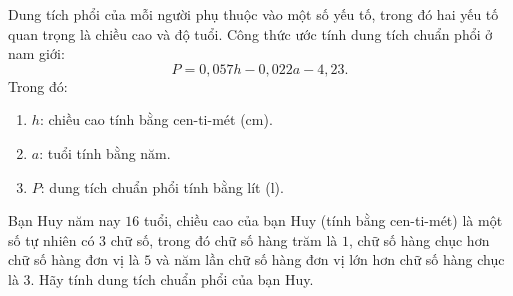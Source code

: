 \begin{bt}%
	Dung tích phổi của mỗi người phụ thuộc vào một số yếu tố, trong đó hai yếu tố quan trọng là chiều cao và độ tuổi. Công thức ước tính dung tích chuẩn phổi ở nam giới: $$P = 0,057h-0,022a-4,23.$$
	Trong đó: \begin{enumerate}
		\item [] $h$: chiều cao tính bằng cen-ti-mét (cm).
		\item [] $a$: tuổi tính bằng năm.
			\item [] $P$: dung tích chuẩn phổi tính bằng lít (l).
	\end{enumerate}
Bạn Huy năm nay $16$ tuổi, chiều cao của bạn Huy (tính bằng cen-ti-mét) là một số tự nhiên có $3$ chữ số, trong đó chữ số hàng trăm là $1$, chữ số hàng chục hơn chữ số hàng đơn vị là $5$ và năm lần chữ số hàng đơn vị lớn hơn chữ số hàng chục là $3$. Hãy tính dung tích chuẩn phổi của bạn Huy.
\end{bt}

